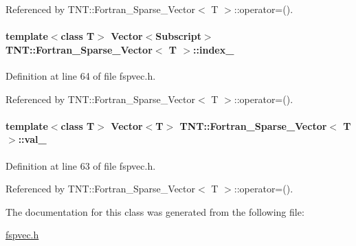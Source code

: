 Referenced by TNT::Fortran\_\-Sparse\_\-Vector$<$ T $>$::operator=().

\paragraph[{index\_\-}]{\setlength{\rightskip}{0pt plus 5cm}template$<$class T$>$ {\bf Vector}$<${\bf Subscript}$>$ {\bf TNT::Fortran\_\-Sparse\_\-Vector}$<$ T $>$::{\bf index\_\-}}\hfill\label{class_t_n_t_1_1_fortran___sparse___vector_a586e6e20ad6a08b4aa6c77eb1c0becb6}


Definition at line 64 of file fspvec.h.



Referenced by TNT::Fortran\_\-Sparse\_\-Vector$<$ T $>$::operator=().

\paragraph[{val\_\-}]{\setlength{\rightskip}{0pt plus 5cm}template$<$class T$>$ {\bf Vector}$<$T$>$ {\bf TNT::Fortran\_\-Sparse\_\-Vector}$<$ T $>$::{\bf val\_\-}}\hfill\label{class_t_n_t_1_1_fortran___sparse___vector_a7b3fc0cdf3104147267ed1d7b5177234}


Definition at line 63 of file fspvec.h.



Referenced by TNT::Fortran\_\-Sparse\_\-Vector$<$ T $>$::operator=().



The documentation for this class was generated from the following file:\begin{DoxyCompactItemize}
\item 
\hyperlink{fspvec_8h}{fspvec.h}\end{DoxyCompactItemize}
